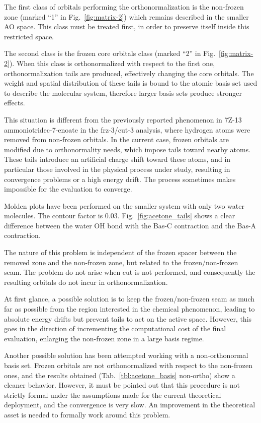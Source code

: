 The first class of orbitals performing the orthonormalization is the
non-frozen zone (marked ``1'' in Fig.~\ref{fig:matrix-2}) which remains
described in the smaller AO space. This class must be treated first, in
order to preserve itself inside this restricted space.

The second class is the frozen core orbitals class (marked ``2'' in
Fig.~\ref{fig:matrix-2}). When this class is orthonormalized with respect to
the first one, orthonormalization tails are produced, effectively changing
the core orbitals. The weight and spatial distribution of these tails is
bound to the atomic basis set used to describe the molecular system,
therefore larger basis sets produce stronger effects.

This situation is different from the previously reported phenomenon in
7Z-13 ammoniotridec-7-enoate in the frz-3/cut-3 analysis, where hydrogen
atoms were removed from non-frozen orbitals. In the current case, frozen
orbitals are modified due to orthonormality needs, which impose tails toward
nearby atoms. These tails introduce an artificial charge shift toward these
atoms, and in particular those involved in the physical process under
study, resulting in convergence problems or a high energy drift. The process
sometimes makes impossible for the evaluation to converge.

Molden plots have been performed on the smaller system with only two water
molecules. The contour factor is 0.03. Fig.~\ref{fig:acetone_tails} shows a
clear difference between the water OH bond with the Bas-C contraction and
the Bas-A contraction.


\vspace{-5mm}
The nature of this problem is independent of the frozen spacer between the
removed zone and the non-frozen zone, but related to the frozen/non-frozen
seam. The problem do not arise when cut is not performed, and consequently
the resulting orbitals do not incur in orthonormalization. 

At first glance, a possible solution is to keep the frozen/non-frozen seam
as much far as possible from the region interested in the chemical
phenomenon, leading to absolute energy drifts but prevent tails to
act on the active space. However, this goes in the direction of incrementing
the computational cost of the final evaluation, enlarging the non-frozen
zone in a large basis regime.

Another possible solution has been attempted working with a non-orthonormal
basis set. Frozen orbitals are not orthonormalized with respect to the
non-frozen ones, and the results obtained (Tab.~\ref{tbl:acetone_basis}
non-ortho) show a cleaner behavior. However, it must be pointed out that this
procedure is not strictly formal under the assumptions made for the current
theoretical deployment, and the convergence is very slow. An improvement in
the theoretical asset is needed to formally work around this problem.
